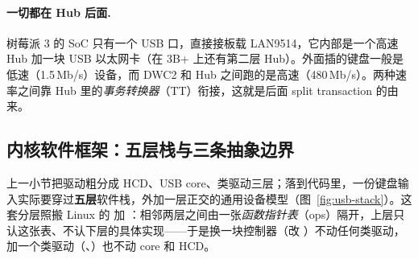 \paragraph{一切都在 Hub 后面.} 树莓派 3 的 SoC 只有一个 USB 口，直接接板载 LAN9514，它内部是一个高速 Hub 加一块 USB 以太网卡（在 3B+ 上还有第二层 Hub）。外面插的键盘一般是低速（1.5\,Mb/s）设备，而 DWC2 和 Hub 之间跑的是高速（480\,Mb/s）。两种速率之间靠 Hub 里的\emph{事务转换器}（TT）衔接，这就是后面 split transaction 的由来。

\subsection{内核软件框架：五层栈与三条抽象边界}

上一小节把驱动粗分成 HCD、USB core、类驱动三层；落到代码里，一份键盘输入实际要穿过\textbf{五层}软件栈，外加一层正交的通用设备模型（图~\ref{fig:usb-stack}）。这套分层照搬 Linux 的  加 ：相邻两层之间由一张\emph{函数指针表}（ops）隔开，上层只认这张表、不认下层的具体实现——于是换一块控制器（改 ）不动任何类驱动，加一个类驱动（、）也不动 core 和 HCD。

